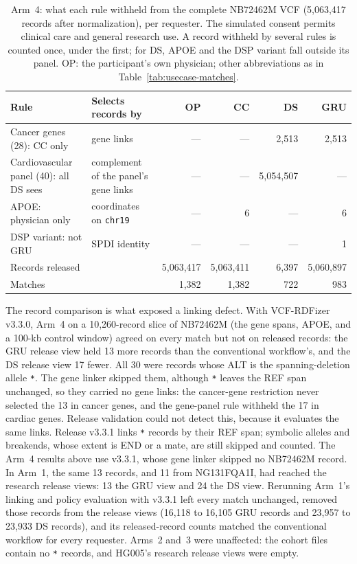 \documentclass[11pt]{article}
\begin{document}
\begin{table}[!htbp]
\caption{Arm~4: what each rule withheld from the complete NB72462M VCF (5,063,417 records after normalization), per requester. The simulated consent permits clinical care and general research use. A record withheld by several rules is counted once, under the first; for DS, APOE and the DSP variant fall outside its panel. OP: the participant's own physician; other abbreviations as in Table~\ref{tab:usecase-matches}.}\label{tab:usecase-layered}%
\centering\footnotesize\setlength{\tabcolsep}{4pt}\renewcommand{\arraystretch}{1.1}%
\begin{tabularx}{\textwidth}{@{}l >{\raggedright\arraybackslash}X r r r r@{}}
\toprule
\textbf{Rule} & \textbf{Selects records by} & \textbf{OP} & \textbf{CC} & \textbf{DS} & \textbf{GRU}\\
\midrule
Cancer genes (28): CC only & gene links & --- & --- & 2{,}513 & 2{,}513\\
Cardiovascular panel (40): all DS sees & complement of the panel's gene links & --- & --- & 5{,}054{,}507 & ---\\
APOE: physician only & coordinates on \texttt{chr19} & --- & 6 & --- & 6\\
DSP variant: not GRU & SPDI identity & --- & --- & --- & 1\\
\midrule
Records released & & 5{,}063{,}417 & 5{,}063{,}411 & 6{,}397 & 5{,}060{,}897\\
Matches & & 1{,}382 & 1{,}382 & 722 & 983\\
\bottomrule
\end{tabularx}
\end{table}

The record comparison is what exposed a linking defect.
With VCF-RDFizer v3.3.0, Arm~4 on a 10,260-record slice of NB72462M (the gene spans, APOE, and a 100-kb control window) agreed on every match but not on released records: the GRU release view held 13 more records than the conventional workflow's, and the DS release view 17 fewer.
All 30 were records whose ALT is the spanning-deletion allele \texttt{*}.
The gene linker skipped them, although \texttt{*} leaves the REF span unchanged, so they carried no gene links: the cancer-gene restriction never selected the 13 in cancer genes, and the gene-panel rule withheld the 17 in cardiac genes.
Release validation could not detect this, because it evaluates the same links.
Release v3.3.1 links \texttt{*} records by their REF span; symbolic alleles and breakends, whose extent is END or a mate, are still skipped and counted.
The Arm~4 results above use v3.3.1, whose gene linker skipped no NB72462M record.
In Arm~1, the same 13 records, and 11 from NG131FQA1I, had reached the research release views: 13 the GRU view and 24 the DS view.
Rerunning Arm~1's linking and policy evaluation with v3.3.1 left every match unchanged, removed those records from the release views (16,118 to 16,105 GRU records and 23,957 to 23,933 DS records), and its released-record counts matched the conventional workflow for every requester.
Arms~2 and~3 were unaffected: the cohort files contain no \texttt{*} records, and HG005's research release views were empty.
\end{document}
